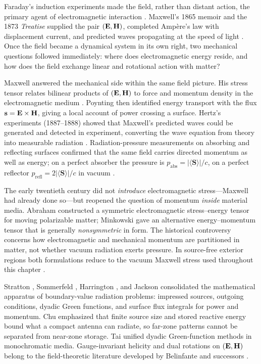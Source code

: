 Faraday's induction experiments made the field, rather than distant action, the primary agent of electromagnetic interaction \cite{maxwell1873}. Maxwell's 1865 memoir and the 1873 \emph{Treatise} supplied the pair $(\mathbf{E},\mathbf{H})$, completed Amp\`ere's law with displacement current, and predicted waves propagating at the speed of light \cite{maxwell1873}. Once the field became a dynamical system in its own right, two mechanical questions followed immediately: where does electromagnetic energy reside, and how does the field exchange linear and rotational action with matter?

Maxwell answered the mechanical side within the same field picture. His stress tensor
relates bilinear products of $(\mathbf{E},\mathbf{H})$ to force and momentum density in the
electromagnetic medium \cite{maxwell1873,stratton1941}. Poynting \cite{poynting1884}
then identified energy transport with the flux $\mathbf{s}=\mathbf{E}\times\mathbf{H}$, giving a local
account of power crossing a surface. Hertz's experiments (1887--1888) showed that
Maxwell's predicted waves could be generated and detected in experiment, converting
the wave equation from theory into measurable radiation \cite{stratton1941}. Radiation-pressure
measurements on absorbing and reflecting surfaces confirmed that the same field carries
directed momentum as well as energy; on a perfect absorber the pressure is $p_{\mathrm{abs}}=|\langle\mathbf{S}\rangle|/c$, on a
perfect reflector $p_{\mathrm{refl}}=2|\langle\mathbf{S}\rangle|/c$ in vacuum \cite{stratton1941}.

The early twentieth century did not \emph{introduce} electromagnetic stress---Maxwell
had already done so---but reopened the question of momentum \emph{inside} material
media. Abraham \cite{abraham1909} constructed a symmetric electromagnetic
stress--energy tensor for moving polarizable matter; Minkowski \cite{minkowski1908} gave an
alternative energy--momentum tensor that is generally \emph{nonsymmetric} in form. The
historical controversy concerns how electromagnetic and mechanical momentum are
partitioned in matter, not whether vacuum radiation exerts pressure. In source-free
exterior regions both formulations reduce to the vacuum Maxwell stress used throughout
this chapter \cite{stratton1941}.

Stratton \cite{stratton1941}, Sommerfeld \cite{sommerfeld1949}, Harrington
\cite{harrington2001}, and Jackson \cite{jackson1999} consolidated the mathematical
apparatus of boundary-value radiation problems: impressed sources, outgoing conditions,
dyadic Green functions, and surface flux integrals for power and momentum. Chu
\cite{chu1948} emphasized that finite source size and stored reactive energy bound what
a compact antenna can radiate, so far-zone patterns cannot be separated from near-zone
storage. Tai \cite{tai1994} unified dyadic Green-function methods in monochromatic media. Gauge-invariant helicity and dual rotations on $(\mathbf{E},\mathbf{H})$ belong to the field-theoretic literature developed by Belinfante and successors \cite{belinfante1940,tai1994}.

